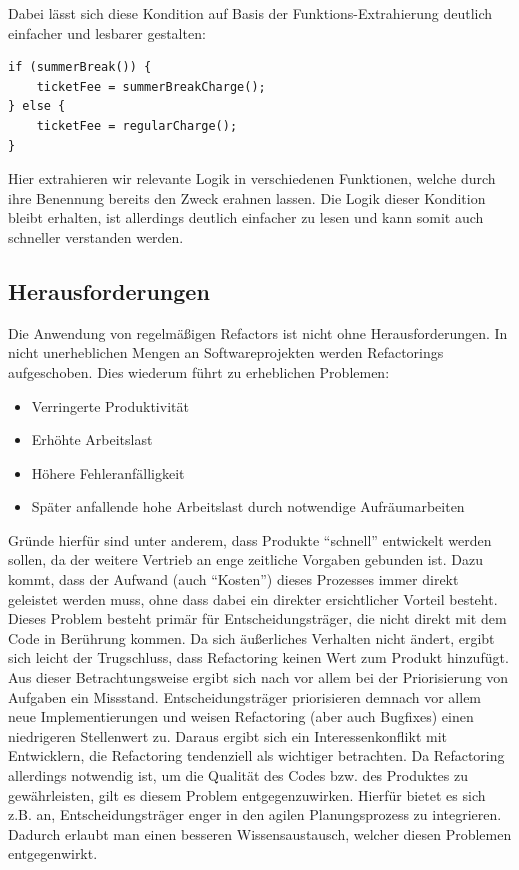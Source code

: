\documentclass[acmtog]{acmart}
\begin{document}
Dabei lässt sich diese Kondition auf Basis der Funktions-Extrahierung deutlich einfacher und lesbarer gestalten:

\begin{lstlisting}[frame=single,breaklines=true]
if (summerBreak()) {
    ticketFee = summerBreakCharge();
} else {
    ticketFee = regularCharge();
}
\end{lstlisting}

Hier extrahieren wir relevante Logik in verschiedenen Funktionen, welche durch ihre Benennung bereits den Zweck erahnen lassen. Die Logik dieser Kondition bleibt erhalten, ist allerdings deutlich einfacher zu lesen und kann somit auch schneller verstanden werden.

\subsection{Herausforderungen}\label{sec:Refactoring_Herausforderungen}

Die Anwendung von regelmäßigen Refactors ist nicht ohne Herausforderungen. In nicht unerheblichen Mengen an Softwareprojekten \cite{articlePerspectives} werden Refactorings aufgeschoben. Dies wiederum führt zu erheblichen Problemen:
\begin{itemize}
  \item Verringerte Produktivität
  \item Erhöhte Arbeitslast
  \item Höhere Fehleranfälligkeit
  \item Später anfallende hohe Arbeitslast durch notwendige Aufräumarbeiten
\end{itemize}
Gründe hierfür sind unter anderem, dass Produkte “schnell” entwickelt werden sollen, da der weitere Vertrieb an enge zeitliche Vorgaben gebunden ist. Dazu kommt, dass der Aufwand (auch “Kosten”) dieses Prozesses immer direkt geleistet werden muss, ohne dass dabei ein direkter ersichtlicher Vorteil besteht. Dieses Problem besteht primär für Entscheidungsträger, die nicht direkt mit dem Code in Berührung kommen. Da sich äußerliches Verhalten nicht ändert, ergibt sich leicht der Trugschluss, dass Refactoring keinen Wert zum Produkt hinzufügt. Aus dieser Betrachtungsweise ergibt sich nach \cite{articlePerspectives} vor allem bei der Priorisierung von Aufgaben ein Missstand. Entscheidungsträger priorisieren demnach vor allem neue Implementierungen und weisen Refactoring (aber auch Bugfixes) einen niedrigeren Stellenwert zu. Daraus ergibt sich ein Interessenkonflikt mit Entwicklern, die Refactoring tendenziell als wichtiger betrachten. Da Refactoring allerdings notwendig ist, um die Qualität des Codes bzw. des Produktes zu gewährleisten, gilt es diesem Problem entgegenzuwirken. Hierfür bietet es sich z.B. an, Entscheidungsträger enger in den agilen Planungsprozess zu integrieren. Dadurch erlaubt man einen besseren Wissensaustausch, welcher diesen Problemen entgegenwirkt.
\end{document}
